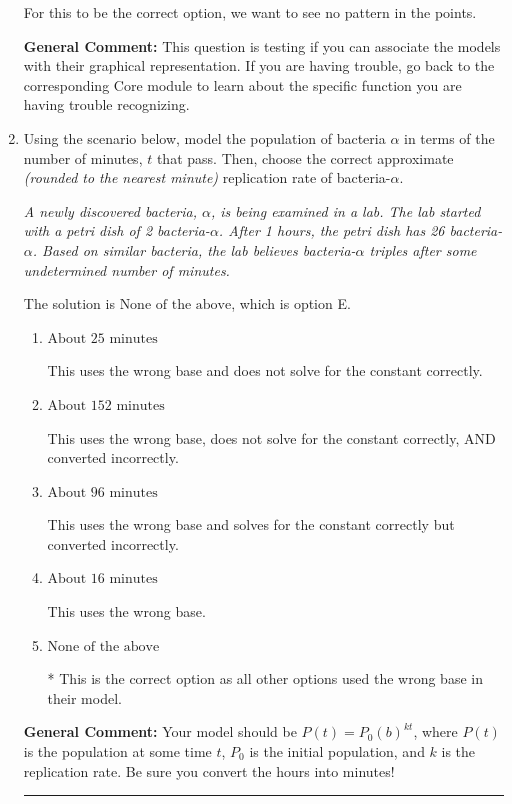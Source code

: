 \documentclass{extbook}[14pt]
\newcommand{\litem}[1]{\item #1

\rule{\textwidth}{0.4pt}}
\begin{document}
\begin{enumerate}
{\begin{enumerate}[label=\Alph*.]
For this to be the correct option, we want to see no pattern in the points.
\end{enumerate}

\textbf{General Comment:} This question is testing if you can associate the models with their graphical representation. If you are having trouble, go back to the corresponding Core module to learn about the specific function you are having trouble recognizing.
}
\litem{
Using the scenario below, model the population of bacteria $\alpha$ in terms of the number of minutes, $t$ that pass. Then, choose the correct approximate \textit{(rounded to the nearest minute)} replication rate of bacteria-$\alpha$.

\begin{center}
    \textit{ A newly discovered bacteria, $\alpha$, is being examined in a lab. The lab started with a petri dish of 2 bacteria-$\alpha$. After 1 hours, the petri dish has 26 bacteria-$\alpha$. Based on similar bacteria, the lab believes bacteria-$\alpha$ triples after some undetermined number of minutes. }
\end{center}


The solution is \( \text{None of the above} \), which is option E.\begin{enumerate}[label=\Alph*.]
\item \( \text{About } 25 \text{ minutes} \)

This uses the wrong base and does not solve for the constant correctly.
\item \( \text{About } 152 \text{ minutes} \)

This uses the wrong base, does not solve for the constant correctly, AND converted incorrectly.
\item \( \text{About } 96 \text{ minutes} \)

This uses the wrong base and solves for the constant correctly but converted incorrectly.
\item \( \text{About } 16 \text{ minutes} \)

This uses the wrong base.
\item \( \text{None of the above} \)

* This is the correct option as all other options used the wrong base in their model.
\end{enumerate}

\textbf{General Comment:} Your model should be $P(t) = P_0(b)^{kt}$, where $P(t)$ is the population at some time $t$, $P_0$ is the initial population, and $k$ is the replication rate. Be sure you convert the hours into minutes!
}
\end{enumerate}
\end{document}
